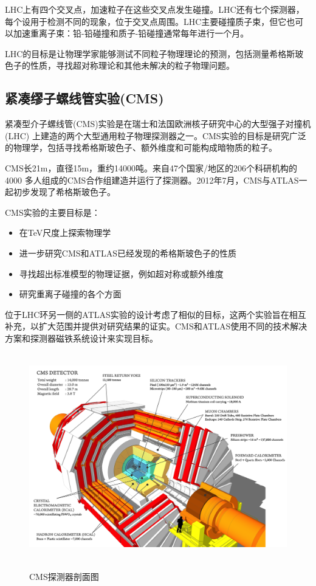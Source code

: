 LHC上有四个交叉点，加速粒子在这些交叉点发生碰撞。LHC还有七个探测器，每个设用于检测不同的现象，位于交叉点周围。LHC主要碰撞质子束，但它也可以加速重离子束：铅-铅碰撞和质子-铅碰撞通常每年进行一个月。

LHC的目标是让物理学家能够测试不同粒子物理理论的预测，包括测量希格斯玻色子的性质，寻找超对称理论和其他未解决的粒子物理问题。

\subsection{紧凑缪子螺线管实验(CMS)}
紧凑型介子螺线管(CMS)实验是在瑞士和法国欧洲核子研究中心的大型强子对撞机(LHC) 上建造的两个大型通用粒子物理探测器之一。CMS实验的目标是研究广泛的物理学，包括寻找希格斯玻色子、额外维度和可能构成暗物质的粒子。

CMS长21m，直径15m，重约14000吨。来自47个国家/地区的206个科研机构的4000 多人组成的CMS合作组建造并运行了探测器。2012年7月，CMS与ATLAS一起初步发现了希格斯玻色子。

CMS实验的主要目标是：
\begin{itemize}
    \item 在TeV尺度上探索物理学
    \item 进一步研究CMS和ATLAS已经发现的希格斯玻色子的性质
    \item 寻找超出标准模型的物理证据，例如超对称或额外维度
    \item 研究重离子碰撞的各个方面
\end{itemize}

位于LHC环另一侧的ATLAS实验的设计考虑了相似的目标，这两个实验旨在相互补充，以扩大范围并提供对研究结果的证实。CMS和ATLAS使用不同的技术解决方案和探测器磁铁系统设计来实现目标。

\begin{figure}[H]
 \centering
 \caption{CMS探测器剖面图}
 \includegraphics[height=9cm, width=13cm]{pictures/CMS_detector.png}
 \label{fig:1.5}
\end{figure}

